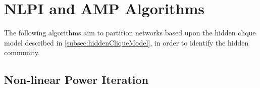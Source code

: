 
\section{NLPI and AMP Algorithms}
\label{sec:NLPIAndAMPAlgorithmsCommunityDetection}

The following algorithms aim to partition networks based upon the hidden clique model described in \cref{subsec:hiddenCliqueModel}, in order to identify the hidden community.


\subsection{Non-linear Power Iteration}
\label{subsec:nonLinearPowerIteration}

